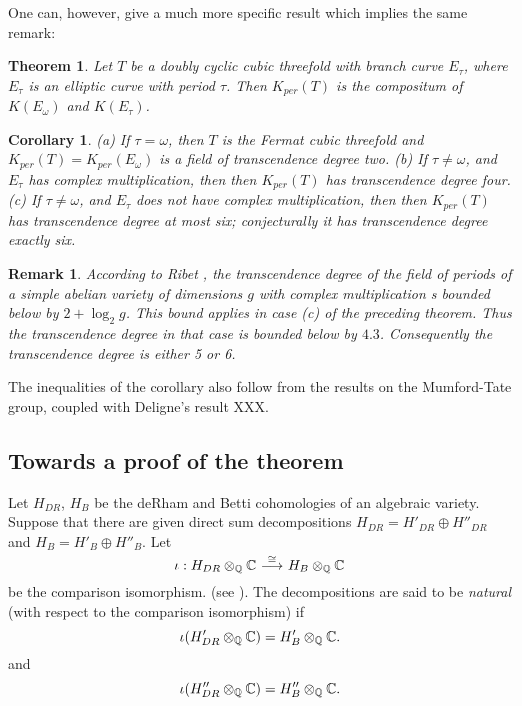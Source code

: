 \documentclass[11pt]{amsart}
\newtheorem{theorem}{Theorem}
\newtheorem{corollary}{Corollary}
\newtheorem{remark}{Remark}
\begin{document}
\noindent
One can, however, give a much more specific result which implies the same remark:

\begin{theorem}
Let $T$ be a doubly cyclic cubic threefold with branch curve $E_\tau$,
where $E_\tau$ is an elliptic curve with period $\tau$.  Then
$K_{per}(T)$ is the compositum of $K(E_\omega)$ and $K(E_\tau)$.
\end{theorem}




\begin{corollary}
(a) If $\tau  = \omega$, then $T$ is the Fermat cubic threefold and  $K_{per}(T) = K_{per}(E_\omega)$ is a field of 
transcendence degree two. (b)  If $\tau  \ne \omega$, and $E_\tau$ has complex
multiplication, then then $K_{per}(T) $ has transcendence degree four. (c)  
If $\tau  \ne \omega$, and $E_\tau$ does not have complex
multiplication, then then $K_{per}(T) $ has transcendence degree at most six; conjecturally
it has transcendence degree exactly six.
\end{corollary}

\begin{remark} \rm {According to Ribet \cite{Ribet:DF}, the transcendence degree of the field of periods of a simple abelian variety
of dimensions $g$ with complex multiplication s bounded below by $2 + \log_2 g$.  This bound applies in case (c) of the
preceding theorem.  Thus the transcendence degree in that case is bounded below by $4.3$.  Consequently the transcendence degree is either 5 or 6.}
\end{remark}

\noindent
The inequalities of the corollary also follow from the results on the Mumford-Tate group, coupled with Deligne's result XXX.

\subsection{Towards a proof of the theorem}

Let $H_{DR}$, $H_B$ be the deRham and Betti cohomologies of an algebraic variety.  Suppose that
there are given direct sum decompositions $H_{DR} = H'_{DR} \oplus H''_{DR}$ and 
 $H_{B} = H'_{B} \oplus H''_{B}$.  Let 
 \[
    \iota: {H_{DR}}\otimes_{\mathbb Q} {\mathbb C} \ \smash{ \mathop{\longrightarrow}\limits^{\cong}}\  {H_B}\otimes_{\mathbb Q} {\mathbb C}
\] 
 be the comparison isomorphism. (see \cite{Deligne:HCA}).
 The decompositions are said to be \emph{natural} (with respect to the comparison isomorphism)
 if
\[
     \iota(  H'_{DR}\otimes_{\mathbb Q} {\mathbb C} ) = H'_{B}\otimes_{\mathbb Q} {\mathbb C} .
\]
and
\[
     \iota(  H''_{DR}\otimes_{\mathbb Q} {\mathbb C} ) = H''_{B}\otimes_{\mathbb Q} {\mathbb C} .
\]
\end{document}
